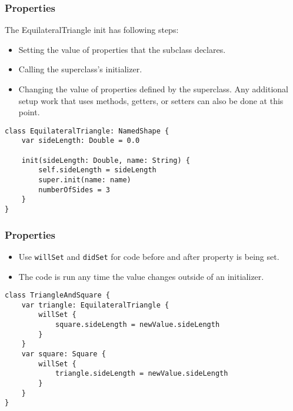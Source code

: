 \begin{frame}[fragile] \frametitle{Properties}

The EquilateralTriangle init has following steps:
\begin{itemize}
\item Setting the value of properties that the subclass declares.
\item Calling the superclass’s initializer.
\item Changing the value of properties defined by the superclass. Any additional setup work that uses methods, getters, or setters can also be done at this point.
\end{itemize}

\begin{lstlisting}[basicstyle=\scriptsize]
class EquilateralTriangle: NamedShape {
    var sideLength: Double = 0.0

    init(sideLength: Double, name: String) {
        self.sideLength = sideLength
        super.init(name: name)
        numberOfSides = 3
    }
}
\end{lstlisting}

\end{frame}

\begin{frame}[fragile] \frametitle{Properties}

\begin{itemize}
\item Use \lstinline|willSet| and \lstinline|didSet| for code before and after property is being set.
\item The code is run any time the value changes outside of an initializer.
\end{itemize}

\begin{lstlisting}[basicstyle=\scriptsize]
class TriangleAndSquare {
    var triangle: EquilateralTriangle {
        willSet {
            square.sideLength = newValue.sideLength
        }
    }
    var square: Square {
        willSet {
            triangle.sideLength = newValue.sideLength
        }
    }
}
\end{lstlisting}
\end{frame}


